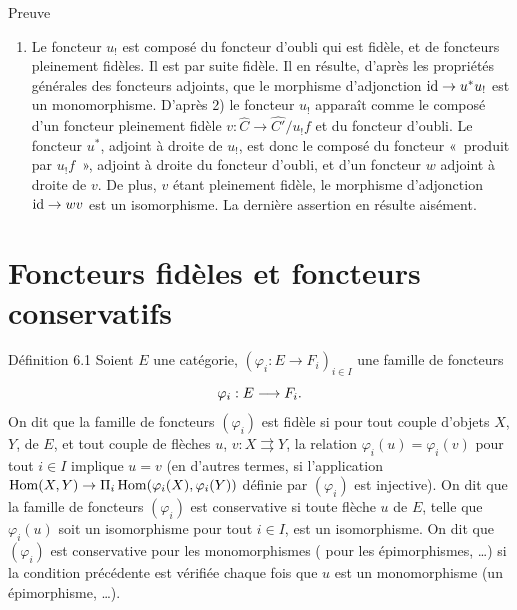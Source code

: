\documentclass[10pt]{../fichiers-configuration-latex/smfart}
\begin{document}
\begin{enonce*}[remark]{Preuve}
\begin{enumerate}
\item Le foncteur $u_{!}$ est composé du foncteur d'oubli qui est
  fidèle, et de foncteurs pleinement fidèles. Il est par suite
  fidèle. Il en résulte, d'après les propriétés
  générales des foncteurs adjoints, que le morphisme d'adjonction
  $\operatorname{id}\rightarrow u^\ast u_{!}$ est un monomorphisme. D'après 2) le
  foncteur $u_{!}$ apparaît comme le composé d'un foncteur
  pleinement fidèle $v:\widehat{C}\to
  \widehat{C'}/u_{!}f$ et du foncteur d'oubli. Le
  foncteur $u^\ast$, adjoint à droite de $u_{!}$, est donc le
  composé du foncteur « produit par $u_{!}f$ », adjoint à
  droite du foncteur d'oubli, et d'un foncteur $w$ adjoint à droite
  de $v$. De plus, $v$ étant pleinement fidèle, le morphisme
  d'adjonction $\operatorname{id}\rightarrow wv$ est un isomorphisme. La dernière
  assertion en résulte aisément.
\end{enumerate}
\end{enonce*}

\section{Foncteurs fidèles et foncteurs
  conservatifs}\pageoriginale

\begin{enonce*}{Définition 6.1}
Soient $E$ une catégorie, $(\varphi_i:E\rightarrow F_i)_{i\in I}$
une famille de foncteurs
$$
\varphi_i:E\longrightarrow F_i{}.
$$
On dit que la famille de foncteurs $(\varphi_i)$ est fidèle si pour
tout couple d'objets $X$, $Y$, de $E$, et tout couple de flèches
$u$, $v:X\rightrightarrows Y$, la relation
$\varphi_i(u)=\varphi_i(v)$ pour tout $i\in I$ implique $u=v$ (en
d'autres termes, si l'application $\operatorname{Hom}(X,Y)\rightarrow
\Pi_i\operatorname{Hom}(\varphi_i(X),\varphi_i(Y))$ définie par $(\varphi_i)$ est
injective). On dit que la famille de foncteurs $(\varphi_i)$ est
conservative si toute flèche $u$ de $E$, telle que $\varphi_i(u)$
soit un isomorphisme pour tout $i\in I$, est un isomorphisme. On dit
que $(\varphi_i)$ est conservative pour les monomorphismes (\resp
pour les épimorphismes, \resp \ldots) si la condition précédente est
vérifiée chaque fois que $u$ est un monomorphisme (\resp  un
épimorphisme, \resp \ldots).
\end{enonce*}

\setcounter{subsection}{1} \setcounter{subsubsection}{0}
\end{document}
